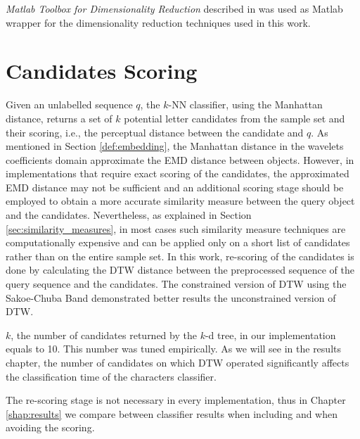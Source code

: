 \iftoggle{edit-mode}{\hspace{0pt}\marginpar{The DR package}}{}
\emph{Matlab Toolbox for Dimensionality Reduction} described in \cite{van2007introduction} was used as Matlab wrapper for the dimensionality reduction techniques used in this work.

\newpage{}

\section{Candidates Scoring}
\label{sec:candidates_scoring}

Given an unlabelled sequence $q$, the $k$-NN classifier, using the Manhattan distance, returns a set of $k$ potential letter candidates from the sample set and their scoring, i.e., the perceptual distance between the candidate and $q$.
As mentioned in Section \ref{def:embedding}, the Manhattan distance in the wavelets coefficients domain approximate the EMD distance between objects. 
However, in implementations that require exact scoring of the candidates, the approximated EMD distance may not be sufficient and an additional scoring stage should be employed to obtain a more accurate similarity measure between the query object and the candidates.
Nevertheless, as explained in Section \ref{sec:similarity_measures}, in most cases such similarity measure techniques are computationally expensive and can be applied only on a short list of candidates rather than on the entire sample set.   
In this work, re-scoring of the candidates is done by calculating the DTW distance between the preprocessed sequence of the query sequence and the candidates.
The constrained version of DTW using the Sakoe-Chuba Band \cite{sakoe1978dynamic} demonstrated better results the unconstrained version of DTW.

$k$, the number of candidates returned by the $k$-d tree, in our implementation equals to 10.
This number was tuned empirically.
As we will see in the results chapter, the number of candidates on which DTW operated significantly affects the classification time of the characters classifier.

The re-scoring stage is not necessary in every implementation, thus in Chapter \ref{shap:results} we compare between classifier results when including and when avoiding the scoring.

\newpage{}

